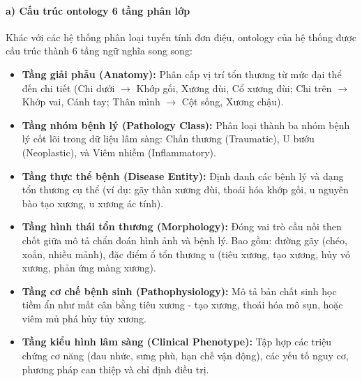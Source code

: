\paragraph{a) Cấu trúc ontology 6 tầng phân lớp}
Khác với các hệ thống phân loại tuyến tính đơn điệu, ontology của hệ thống được cấu trúc thành 6 tầng ngữ nghĩa song song:
\begin{itemize}
    \item \textbf{Tầng giải phẫu (Anatomy):} Phân cấp vị trí tổn thương từ mức đại thể đến chi tiết (Chi dưới $\rightarrow$ Khớp gối, Xương đùi, Cổ xương đùi; Chi trên $\rightarrow$ Khớp vai, Cánh tay; Thân mình $\rightarrow$ Cột sống, Xương chậu).
    \item \textbf{Tầng nhóm bệnh lý (Pathology Class):} Phân loại thành ba nhóm bệnh lý cốt lõi trong dữ liệu lâm sàng: Chấn thương (Traumatic), U bướu (Neoplastic), và Viêm nhiễm (Inflammatory).
    \item \textbf{Tầng thực thể bệnh (Disease Entity):} Định danh các bệnh lý và dạng tổn thương cụ thể (ví dụ: gãy thân xương đùi, thoái hóa khớp gối, u nguyên bào tạo xương, u xương ác tính).
    \item \textbf{Tầng hình thái tổn thương (Morphology):} Đóng vai trò cầu nối then chốt giữa mô tả chẩn đoán hình ảnh và bệnh lý. Bao gồm: đường gãy (chéo, xoắn, nhiều mảnh), đặc điểm ổ tổn thương u (tiêu xương, tạo xương, hủy vỏ xương, phản ứng màng xương).
    \item \textbf{Tầng cơ chế bệnh sinh (Pathophysiology):} Mô tả bản chất sinh học tiềm ẩn như mất cân bằng tiêu xương - tạo xương, thoái hóa mô sụn, hoặc viêm mủ phá hủy tủy xương.
    \item \textbf{Tầng kiểu hình lâm sàng (Clinical Phenotype):} Tập hợp các triệu chứng cơ năng (đau nhức, sưng phù, hạn chế vận động), các yếu tố nguy cơ, phương pháp can thiệp và chỉ định điều trị.
\end{itemize}

